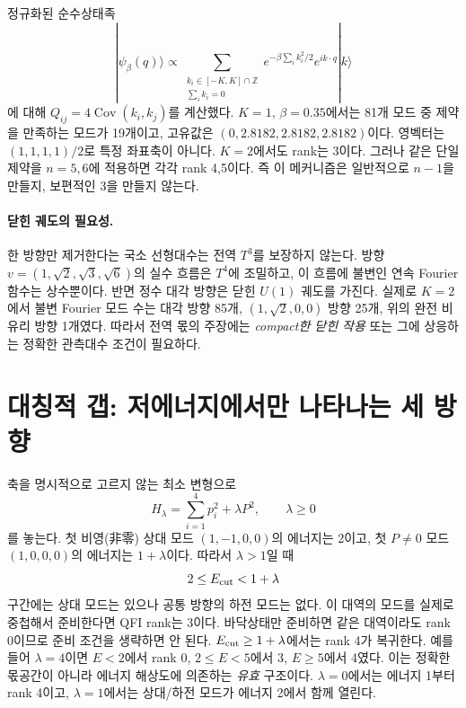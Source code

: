 \documentclass[11pt,a4paper]{article}
\begin{document}
정규화된 순수상태족
\begin{equation}
|\psi_\beta(q)\rangle\propto
\sum_{\substack{k_i\in[-K,K]\cap\mathbb Z\\\sum_i k_i=0}}
e^{-\beta\sum_i k_i^2/2}e^{i k\cdot q}|k\rangle
\end{equation}
에 대해 $Q_{ij}=4\operatorname{Cov}(k_i,k_j)$를 계산했다.
$K=1,\,\beta=0.35$에서는 81개 모드 중 제약을 만족하는 모드가 19개이고,
고유값은 $(0,2.8182,2.8182,2.8182)$이다. 영벡터는
$(1,1,1,1)/2$로 특정 좌표축이 아니다. $K=2$에서도 rank는 3이다.
그러나 같은 단일 제약을 $n=5,6$에 적용하면 각각 rank 4,5이다.
즉 이 메커니즘은 일반적으로 $n-1$을 만들지, 보편적인 3을 만들지 않는다.

\paragraph{닫힌 궤도의 필요성.}
한 방향만 제거한다는 국소 선형대수는 전역 $T^3$를 보장하지 않는다.
방향 $v=(1,\sqrt2,\sqrt3,\sqrt6)$의 실수 흐름은 $T^4$에 조밀하고,
이 흐름에 불변인 연속 Fourier 함수는 상수뿐이다.
반면 정수 대각 방향은 닫힌 $U(1)$ 궤도를 가진다.
실제로 $K=2$에서 불변 Fourier 모드 수는 대각 방향 85개,
$(1,\sqrt2,0,0)$ 방향 25개, 위의 완전 비유리 방향 1개였다.
따라서 전역 몫의 주장에는 \emph{compact한 닫힌 작용} 또는 그에
상응하는 정확한 관측대수 조건이 필요하다.

\section{대칭적 갭: 저에너지에서만 나타나는 세 방향}
축을 명시적으로 고르지 않는 최소 변형으로
\begin{equation}
H_\lambda=\sum_{i=1}^4p_i^2+\lambda P^2,\qquad \lambda\ge0
\end{equation}
를 놓는다. 첫 비영(非零) 상대 모드 $(1,-1,0,0)$의 에너지는 2이고,
첫 $P\ne0$ 모드 $(1,0,0,0)$의 에너지는 $1+\lambda$이다.
따라서 $\lambda>1$일 때
\begin{equation}
2\le E_{\rm cut}<1+\lambda
\label{eq:window}
\end{equation}
구간에는 상대 모드는 있으나 공통 방향의 하전 모드는 없다.
이 대역의 모드를 실제로 중첩해서 준비한다면 QFI rank는 3이다.
바닥상태만 준비하면 같은 대역이라도 rank 0이므로 준비 조건을
생략하면 안 된다. $E_{\rm cut}\ge1+\lambda$에서는 rank 4가 복귀한다.
예를 들어 $\lambda=4$이면 $E<2$에서 rank 0,
$2\le E<5$에서 3, $E\ge5$에서 4였다.
이는 정확한 몫공간이 아니라 에너지 해상도에 의존하는 \emph{유효}
구조이다. $\lambda=0$에서는 에너지 1부터 rank 4이고,
$\lambda=1$에서는 상대/하전 모드가 에너지 2에서 함께 열린다.
\end{document}
